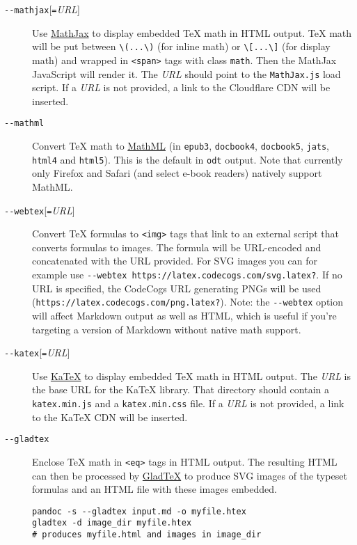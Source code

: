 \begin{description}
\item[\texttt{-\/-mathjax}{[}\texttt{=}\emph{URL}{]}]
Use \href{https://www.mathjax.org}{MathJax} to display embedded TeX math
in HTML output. TeX math will be put between
\texttt{\textbackslash{}(...\textbackslash{})} (for inline math) or
\texttt{\textbackslash{}{[}...\textbackslash{}{]}} (for display math)
and wrapped in \texttt{\textless{}span\textgreater{}} tags with class
\texttt{math}. Then the MathJax JavaScript will render it. The
\emph{URL} should point to the \texttt{MathJax.js} load script. If a
\emph{URL} is not provided, a link to the Cloudflare CDN will be
inserted.
\item[\texttt{-\/-mathml}]
Convert TeX math to \href{https://www.w3.org/Math/}{MathML} (in
\texttt{epub3}, \texttt{docbook4}, \texttt{docbook5}, \texttt{jats},
\texttt{html4} and \texttt{html5}). This is the default in \texttt{odt}
output. Note that currently only Firefox and Safari (and select e-book
readers) natively support MathML.
\item[\texttt{-\/-webtex}{[}\texttt{=}\emph{URL}{]}]
Convert TeX formulas to \texttt{\textless{}img\textgreater{}} tags that
link to an external script that converts formulas to images. The formula
will be URL-encoded and concatenated with the URL provided. For SVG
images you can for example use
\texttt{-\/-webtex\ https://latex.codecogs.com/svg.latex?}. If no URL is
specified, the CodeCogs URL generating PNGs will be used
(\texttt{https://latex.codecogs.com/png.latex?}). Note: the
\texttt{-\/-webtex} option will affect Markdown output as well as HTML,
which is useful if you're targeting a version of Markdown without native
math support.
\item[\texttt{-\/-katex}{[}\texttt{=}\emph{URL}{]}]
Use \href{https://github.com/Khan/KaTeX}{KaTeX} to display embedded TeX
math in HTML output. The \emph{URL} is the base URL for the KaTeX
library. That directory should contain a \texttt{katex.min.js} and a
\texttt{katex.min.css} file. If a \emph{URL} is not provided, a link to
the KaTeX CDN will be inserted.
\item[\texttt{-\/-gladtex}]
Enclose TeX math in \texttt{\textless{}eq\textgreater{}} tags in HTML
output. The resulting HTML can then be processed by
\href{https://humenda.github.io/GladTeX/}{GladTeX} to produce SVG images
of the typeset formulas and an HTML file with these images embedded.

\begin{verbatim}
pandoc -s --gladtex input.md -o myfile.htex
gladtex -d image_dir myfile.htex
# produces myfile.html and images in image_dir
\end{verbatim}
\end{description}


